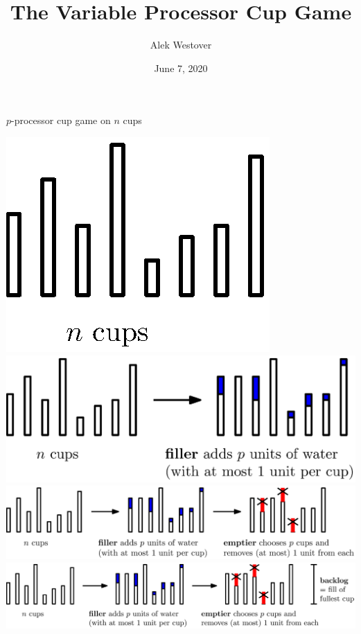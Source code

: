 \documentclass[xcolor=x11names, svgnames, rgb]{beamer}
\title{The Variable Processor Cup Game}
\author{Alek Westover}
\institute{Belmont High School}
\date{June 7, 2020}
\begin{document}
 
\frame{\titlepage}

\begin{frame}[c]{$p$-processor cup game on $n$ cups}
  \begin{overprint}
     \includegraphics[width=\linewidth]{initDef/initDef0.eps}
     \includegraphics[width=\linewidth]{initDef/initDef1.eps}
     \includegraphics[width=\linewidth]{initDef/initDef2.eps}
     \includegraphics[width=\linewidth]{initDef/initDef3.eps}
  \end{overprint}
\end{frame}
\end{document}
